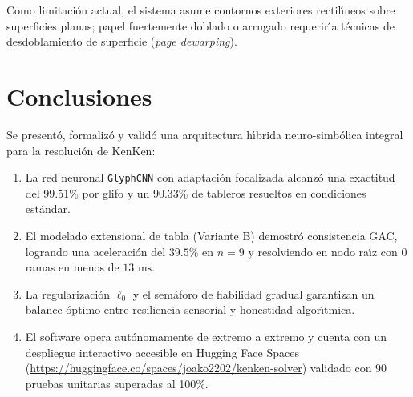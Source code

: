\documentclass[conference]{IEEEtran}
\begin{document}
Como limitaci\'on actual, el sistema asume contornos exteriores rectil\'{\i}neos sobre superficies planas; papel fuertemente doblado o arrugado requerir\'{\i}a t\'ecnicas de desdoblamiento de superficie (\textit{page dewarping}).

\section{Conclusiones}
\label{sec:conclusions}
Se present\'o, formaliz\'o y valid\'o una arquitectura h\'{\i}brida neuro-simb\'olica integral para la resoluci\'on de KenKen:
\begin{enumerate}
    \item La red neuronal \texttt{GlyphCNN} con adaptaci\'on focalizada alcanz\'o una exactitud del $99.51\%$ por glifo y un $90.33\%$ de tableros resueltos en condiciones est\'andar.
    \item El modelado extensional de tabla (Variante B) demostr\'o consistencia GAC, logrando una aceleraci\'on del $39.5\%$ en $n=9$ y resolviendo en nodo ra\'{\i}z con 0 ramas en menos de $13\text{ ms}$.
    \item La regularizaci\'on $\ell_0$ y el sem\'aforo de fiabilidad gradual garantizan un balance \'optimo entre resiliencia sensorial y honestidad algor\'{\i}tmica.
    \item El software opera aut\'onomamente de extremo a extremo y cuenta con un despliegue interactivo accesible en Hugging Face Spaces (\url{https://huggingface.co/spaces/joako2202/kenken-solver}) validado con 90 pruebas unitarias superadas al 100\%.
\end{enumerate}
\end{document}
